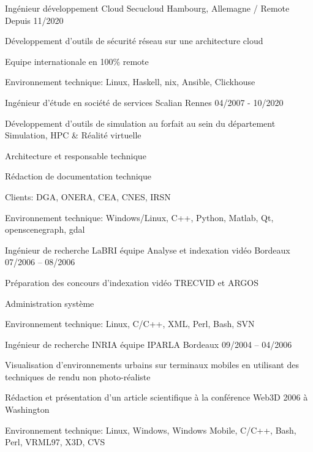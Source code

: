 \begin{cventries}
  \cventry
    {Ingénieur développement Cloud}
    {Secucloud}
    {Hambourg, Allemagne / Remote}
    {Depuis 11/2020}
    {
      \begin{cvitems}
        \item {Développement d'outils de sécurité réseau sur une architecture
            cloud}
        \item {Equipe internationale en 100\% remote}
        \item {Environnement technique: Linux, Haskell, nix, Ansible, Clickhouse}
      \end{cvitems}
    }

  \cventry
    {Ingénieur d'étude en société de services}
    {Scalian}
    {Rennes}
    {04/2007 - 10/2020}
    {
      \begin{cvitems}
        \item {Développement d'outils de simulation au forfait au sein du
            département Simulation, HPC \& Réalité virtuelle}
        \item {Architecture et responsable technique}
        \item {Rédaction de documentation technique}
        \item {Clients: DGA, ONERA, CEA, CNES, IRSN}
        \item {Environnement technique: Windows/Linux, C++, Python, Matlab, Qt,
            openscenegraph, gdal}
      \end{cvitems}
    }

  \cventry
    {Ingénieur de recherche}
    {LaBRI équipe Analyse et indexation vidéo}
    {Bordeaux}
    {07/2006 – 08/2006}
    {
      \begin{cvitems}
        \item {Préparation des concours d'indexation vidéo TRECVID et ARGOS}
        \item {Administration système}
        \item {Environnement technique: Linux, C/C++, XML, Perl, Bash, SVN}
      \end{cvitems}
    }

  \cventry
    {Ingénieur de recherche}
    {INRIA équipe IPARLA}
    {Bordeaux}
    {09/2004 – 04/2006}
    {
      \begin{cvitems}
        \item {Visualisation d'environnements urbains sur terminaux mobiles en
            utilisant des techniques de rendu non photo-réaliste}
        \item {Rédaction et présentation d'un article scientifique à la
            conférence Web3D 2006 à Washington}
        \item {Environnement technique: Linux, Windows, Windows Mobile, C/C++,
            Bash, Perl, VRML97, X3D, CVS}
      \end{cvitems}
    }


\end{cventries}
